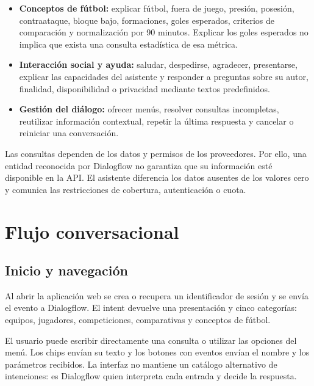 \documentclass[11pt,a4paper]{article}
\newcommand{\codigo}[1]{\texttt{\detokenize{#1}}}
\begin{document}
\begin{itemize}
\item \textbf{Conceptos de fútbol:} explicar fútbol, fuera de juego, presión, posesión, contraataque, bloque bajo, formaciones, goles esperados, criterios de comparación y normalización por 90 minutos. Explicar los goles esperados no implica que exista una consulta estadística de esa métrica.
\item \textbf{Interacción social y ayuda:} saludar, despedirse, agradecer, presentarse, explicar las capacidades del asistente y responder a preguntas sobre su autor, finalidad, disponibilidad o privacidad mediante textos predefinidos.
\item \textbf{Gestión del diálogo:} ofrecer menús, resolver consultas incompletas, reutilizar información contextual, repetir la última respuesta y cancelar o reiniciar una conversación.
\end{itemize}

Las consultas dependen de los datos y permisos de los proveedores. Por ello, una entidad reconocida por Dialogflow no garantiza que su información esté disponible en la API. El asistente diferencia los datos ausentes de los valores cero y comunica las restricciones de cobertura, autenticación o cuota.

\section{Flujo conversacional}

\subsection{Inicio y navegación}

Al abrir la aplicación web se crea o recupera un identificador de sesión y se envía el evento \codigo{WELCOME} a Dialogflow. El intent \codigo{sistema.bienvenida} devuelve una presentación y cinco categorías: equipos, jugadores, competiciones, comparativas y conceptos de fútbol.

El usuario puede escribir directamente una consulta o utilizar las opciones del menú. Los chips envían su texto y los botones con eventos envían el nombre y los parámetros recibidos. La interfaz no mantiene un catálogo alternativo de intenciones: es Dialogflow quien interpreta cada entrada y decide la respuesta.
\end{document}
